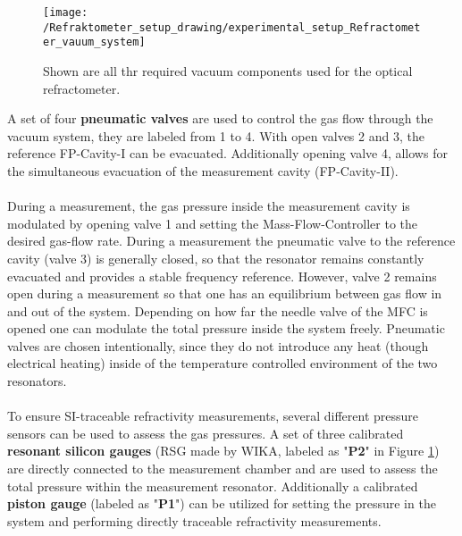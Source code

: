 \begin{figure}[H]
	\centering
	\texttt{[image: /Refraktometer\_setup\_drawing/experimental\_setup\_Refractometer\_vauum\_system]}
	\caption{Shown are all thr required vacuum components used for the optical refractometer.}
	\label{fig:experimental_setup_Refractometer_vauum_system}
\end{figure}
\newpage
\noindent
A set of four \textbf{pneumatic valves} are used to control the gas flow through the vacuum system, they are labeled from 1 to 4. With open valves 2 and 3, the reference FP-Cavity-I can be evacuated. Additionally opening valve 4, allows for the simultaneous evacuation of the measurement cavity (FP-Cavity-II).\\\\
\noindent
During a measurement, the gas pressure inside the measurement cavity is modulated by opening valve 1 and setting the Mass-Flow-Controller to the desired gas-flow rate. During a measurement the pneumatic valve to the reference cavity (valve 3) is generally closed, so that the resonator remains constantly evacuated and provides a stable frequency reference. However, valve 2 remains open during a measurement so that one has an equilibrium between gas flow in and out of the system. Depending on how far the needle valve of the MFC is opened one can modulate the total pressure inside the system freely. Pneumatic valves are chosen intentionally, since they do not introduce any heat (though electrical heating) inside of the temperature controlled environment of the two resonators. \\\\
\noindent
To ensure SI-traceable refractivity measurements, several different pressure sensors can be used to assess the gas pressures. A set of three calibrated \textbf{resonant silicon gauges} (RSG made by WIKA, labeled as "\textbf{P2}" in Figure \ref{fig:experimental_setup_Refractometer_vauum_system}) are directly connected to the measurement chamber and are used to assess the total pressure within the measurement resonator. Additionally a calibrated \textbf{piston gauge} (labeled as "\textbf{P1}") can be utilized for setting the pressure in the system and performing directly traceable refractivity measurements.
